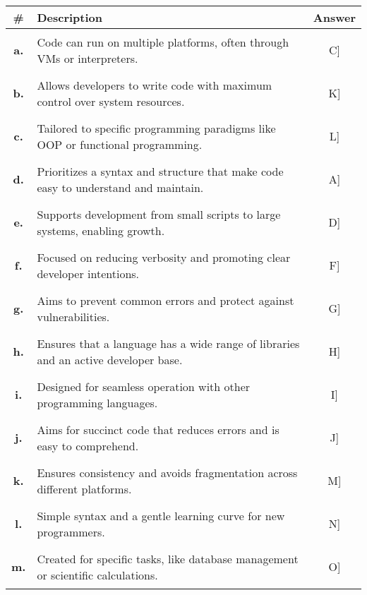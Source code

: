 \documentclass[12pt, addpoints, answers]{exam}
\newif\ifprintanswers
\newcommand{\fillin}[1]{%
  \ifprintanswers
    \textbf{#1}%
  \else
    \underline{\hspace{2mm}}%
  \fi
}
\begin{document}
\begin{questions}
	\begin{table}[H]
		\centering
\small
\setlength{\tabcolsep}{5pt} %
\renewcommand{\arraystretch}{1} %
		\begin{tabular}{|c|p{13.5cm}|c|}
			\hline
			     \#        & \textbf{Description}                                                                & \textbf{Answer}            \\ \hline
		\textbf{	a.} & Code can run on multiple platforms, often through VMs or interpreters.              & \rule{0pt}{.8cm}\fillin[C] \\ \hline
		\textbf{	b.} & Allows developers to write code with maximum control over system resources.         & \rule{0pt}{.8cm}\fillin[K] \\ \hline
		\textbf{	c.} & Tailored to specific programming paradigms like OOP or functional programming.      & \rule{0pt}{.8cm}\fillin[L] \\ \hline
		\textbf{	d.} & Prioritizes a syntax and structure that make code easy to understand and maintain.  & \rule{0pt}{.8cm}\fillin[A] \\ \hline
		\textbf{	e.} & Supports development from small scripts to large systems, enabling growth.          & \rule{0pt}{.8cm}\fillin[D] \\ \hline
		\textbf{	f.} & Focused on reducing verbosity and promoting clear developer intentions.             & \rule{0pt}{.8cm}\fillin[F] \\ \hline
		\textbf{	g.} & Aims to prevent common errors and protect against vulnerabilities.                  & \rule{0pt}{.8cm}\fillin[G] \\ \hline
		\textbf{	h.} & Ensures that a language has a wide range of libraries and an active developer base. & \rule{0pt}{.8cm}\fillin[H] \\ \hline
		\textbf{	i.} & Designed for seamless operation with other programming languages.                   & \rule{0pt}{.8cm}\fillin[I] \\ \hline
		\textbf{	j.} & Aims for succinct code that reduces errors and is easy to comprehend.               & \rule{0pt}{.8cm}\fillin[J] \\ \hline
		\textbf{	k.} & Ensures consistency and avoids fragmentation across different platforms.            & \rule{0pt}{.8cm}\fillin[M] \\ \hline
		\textbf{	l.} & Simple syntax and a gentle learning curve for new programmers.                      & \rule{0pt}{.8cm}\fillin[N] \\ \hline
		\textbf{	m.} & Created for specific tasks, like database management or scientific calculations.    & \rule{0pt}{.8cm}\fillin[O] \\ \hline
		\end{tabular}
	\end{table}
				

\end{questions}
\end{document}

